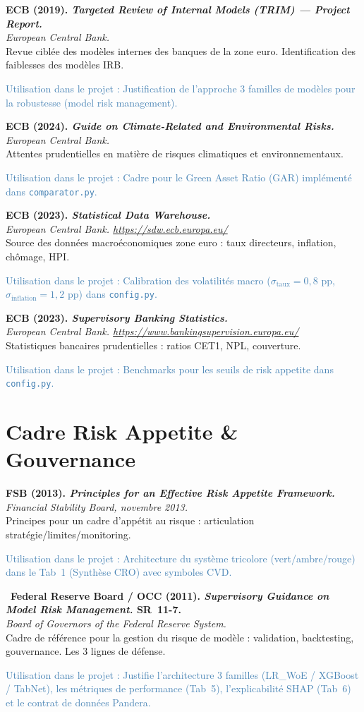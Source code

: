 \documentclass[12pt,a4paper]{article}
\newcommand{\bibentry}[4]{%
  \noindent\textbf{#1}\\
  \textit{#2}\\
  #3\par
  \textcolor{steelblue}{\footnotesize\textsf{Utilisation dans le projet :} #4}\par
  \medskip
}
\newcommand{\bibentrystar}[4]{%
  \noindent{\color{goldstar}$\bigstar$}~\textbf{#1}\\
  \textit{#2}\\
  #3\par
  \textcolor{steelblue}{\footnotesize\textsf{Utilisation dans le projet :} #4}\par
  \medskip
}
\begin{document}
\bibentry{ECB (2019). \emph{Targeted Review of Internal Models (TRIM) --- Project Report.}}{European Central Bank.}{Revue ciblée des modèles internes des banques de la zone euro. Identification des faiblesses des modèles IRB.}{Justification de l'approche 3 familles de modèles pour la robustesse (model risk management).}

\bibentry{ECB (2024). \emph{Guide on Climate-Related and Environmental Risks.}}{European Central Bank.}{Attentes prudentielles en matière de risques climatiques et environnementaux.}{Cadre pour le Green Asset Ratio (GAR) implémenté dans \texttt{comparator.py}.}

\bibentry{ECB (2023). \emph{Statistical Data Warehouse.}}{European Central Bank. \url{https://sdw.ecb.europa.eu/}}{Source des données macroéconomiques zone euro : taux directeurs, inflation, chômage, HPI.}{Calibration des volatilités macro ($\sigma_\text{taux} = 0{,}8$ pp, $\sigma_\text{inflation} = 1{,}2$ pp) dans \texttt{config.py}.}

\bibentry{ECB (2023). \emph{Supervisory Banking Statistics.}}{European Central Bank. \url{https://www.bankingsupervision.europa.eu/}}{Statistiques bancaires prudentielles : ratios CET1, NPL, couverture.}{Benchmarks pour les seuils de risk appetite dans \texttt{config.py}.}

\section{Cadre Risk Appetite \& Gouvernance}

\bibentry{FSB (2013). \emph{Principles for an Effective Risk Appetite Framework.}}{Financial Stability Board, novembre 2013.}{Principes pour un cadre d'appétit au risque : articulation stratégie/limites/monitoring.}{Architecture du système tricolore (vert/ambre/rouge) dans le Tab~1 (Synthèse CRO) avec symboles CVD.}

\bibentrystar{Federal Reserve Board / OCC (2011). \emph{Supervisory Guidance on Model Risk Management.} SR~11-7.}{Board of Governors of the Federal Reserve System.}{Cadre de référence pour la gestion du risque de modèle : validation, backtesting, gouvernance. Les 3 lignes de défense.}{Justifie l'architecture 3 familles (LR\_WoE / XGBoost / TabNet), les métriques de performance (Tab~5), l'explicabilité SHAP (Tab~6) et le contrat de données Pandera.}
\end{document}
